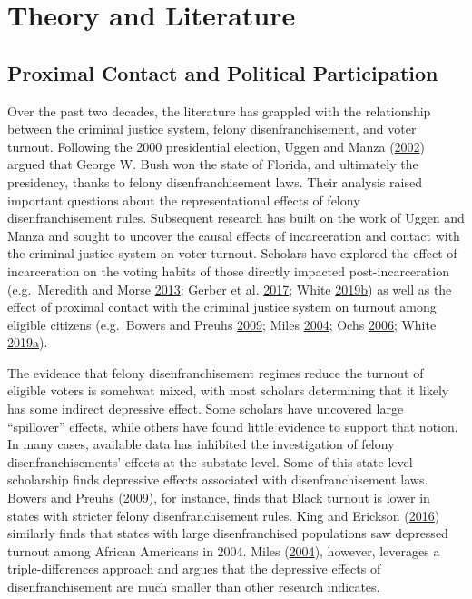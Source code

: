\documentclass[
  12pt,
]{article}
\begin{document}
\hypertarget{theory-and-literature}{%
\section*{Theory and Literature}\label{theory-and-literature}}

\hypertarget{proximal-contact-and-political-participation}{%
\subsection*{Proximal Contact and Political Participation}\label{proximal-contact-and-political-participation}}

Over the past two decades, the literature has grappled with the relationship between the criminal justice system, felony disenfranchisement, and voter turnout. Following the 2000 presidential election, Uggen and Manza (\protect\hyperlink{ref-Uggen2002}{2002}) argued that George W. Bush won the state of Florida, and ultimately the presidency, thanks to felony disenfranchisement laws. Their analysis raised important questions about the representational effects of felony disenfranchisement rules. Subsequent research has built on the work of Uggen and Manza and sought to uncover the causal effects of incarceration and contact with the criminal justice system on voter turnout. Scholars have explored the effect of incarceration on the voting habits of those directly impacted post-incarceration (e.g.~Meredith and Morse \protect\hyperlink{ref-Meredith2013}{2013}; Gerber et al. \protect\hyperlink{ref-Gerber2017}{2017}; White \protect\hyperlink{ref-White2019}{2019}\protect\hyperlink{ref-White2019}{b}) as well as the effect of proximal contact with the criminal justice system on turnout among eligible citizens (e.g.~Bowers and Preuhs \protect\hyperlink{ref-Bowers2009}{2009}; Miles \protect\hyperlink{ref-Miles2004}{2004}; Ochs \protect\hyperlink{ref-Ochs2006}{2006}; White \protect\hyperlink{ref-White2019a}{2019}\protect\hyperlink{ref-White2019a}{a}).

The evidence that felony disenfranchisement regimes reduce the turnout of eligible voters is somehwat mixed, with most scholars determining that it likely has some indirect depressive effect. Some scholars have uncovered large ``spillover'' effects, while others have found little evidence to support that notion. In many cases, available data has inhibited the investigation of felony disenfranchisements' effects at the substate level. Some of this state-level scholarship finds depressive effects associated with disenfranchisement laws. Bowers and Preuhs (\protect\hyperlink{ref-Bowers2009}{2009}), for instance, finds that Black turnout is lower in states with stricter felony disenfranchisement rules. King and Erickson (\protect\hyperlink{ref-King2016}{2016}) similarly finds that states with large disenfranchised populations saw depressed turnout among African Americans in 2004. Miles (\protect\hyperlink{ref-Miles2004}{2004}), however, leverages a triple-differences approach and argues that the depressive effects of disenfranchisement are much smaller than other research indicates.
\end{document}
